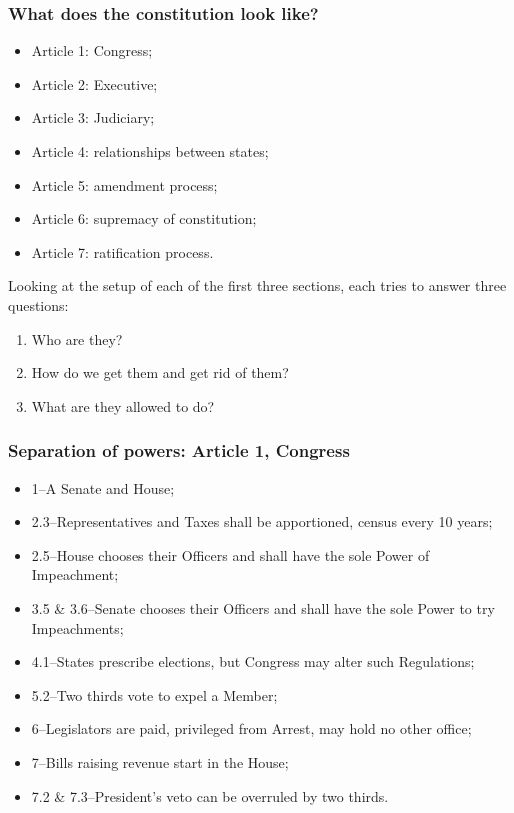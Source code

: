 \documentclass[aspectratio=169]{beamer}
\theoremstyle{principle}
\begin{document}
\begin{frame}
\frametitle{What does the constitution look like?}
\begin{itemize}
\item Article 1: Congress;
\bigskip
\item Article 2: Executive;
\bigskip
\item Article 3: Judiciary;
\bigskip
\item Article 4: relationships between states;
\bigskip
\item Article 5: amendment process;
\bigskip
\item Article 6: supremacy of constitution;
\bigskip
\item Article 7: ratification process.
\end{itemize}

\end{frame}

\begin{frame}

Looking at the setup of each of the first three sections, each tries to answer three questions:
\bigskip
\begin{enumerate}
\item Who are they?
\bigskip
\bigskip
\item How do we get them and get rid of them?
\bigskip
\bigskip
\item What are they allowed to do?
\end{enumerate}

\end{frame}

\begin{frame}
\frametitle{Separation of powers: Article 1, Congress}

\begin{itemize}
\item 1--A Senate and House;
\item 2.3--Representatives and Taxes shall be apportioned, census every 10 years;
\item 2.5--House chooses their Officers and shall have the sole Power of Impeachment;
\item 3.5 \& 3.6--Senate chooses their Officers and shall have the sole Power to try Impeachments;
\item 4.1--States prescribe elections, but Congress may alter such Regulations;
\item 5.2--Two thirds vote to expel a Member;
\item 6--Legislators are paid, privileged from Arrest, may hold no other office;
\item 7--Bills raising revenue start in the House;
\item 7.2 \& 7.3--President's veto can be overruled by two thirds.
\end{itemize}

\end{frame}
\end{document}
